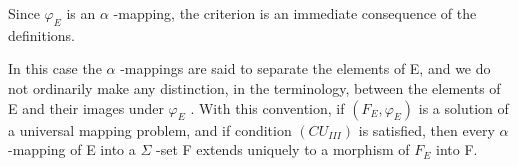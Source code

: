 Since \(\varphi_{E}\) is an \(\alpha\) -mapping, the criterion is an immediate consequence of the definitions.

In this case the \(\alpha\) -mappings are said to separate the elements of E, and we do not ordinarily make any distinction, in the terminology, between the elements of E and their images under \(\varphi_{E}\) . With this convention, if \((F_{E}, \varphi_{E})\) is a solution of a universal mapping problem, and if condition \((CU_{III})\) is satisfied, then every \(\alpha\) -mapping of E into a \(\Sigma\) -set F extends uniquely to a morphism of \(F_{E}\) into F.

